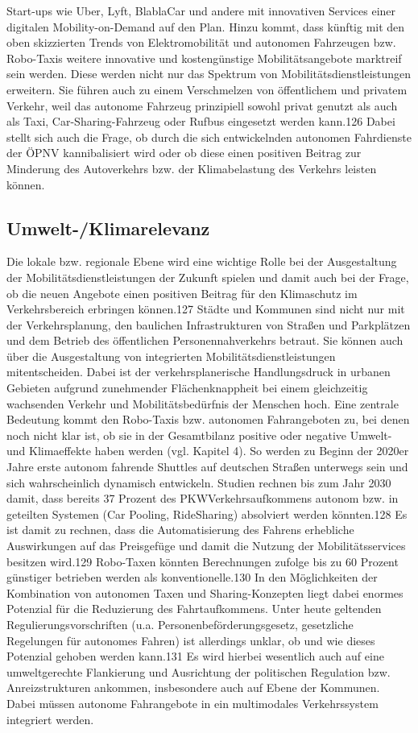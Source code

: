 Start-ups wie Uber, Lyft, BlablaCar und andere mit innovativen Services einer
digitalen Mobility-on-Demand auf den Plan.
Hinzu kommt, dass künftig mit den oben skizzierten Trends von Elektromobilität und autonomen Fahrzeugen bzw. Robo-Taxis weitere innovative und kostengünstige Mobilitätsangebote marktreif sein werden. Diese werden nicht nur
das Spektrum von Mobilitätsdienstleistungen erweitern. Sie führen auch zu einem
Verschmelzen von öffentlichem und privatem Verkehr, weil das autonome Fahrzeug prinzipiell sowohl privat genutzt als auch als Taxi, Car-Sharing-Fahrzeug
oder Rufbus eingesetzt werden kann.126 Dabei stellt sich auch die Frage, ob durch
die sich entwickelnden autonomen Fahrdienste der ÖPNV kannibalisiert wird
oder ob diese einen positiven Beitrag zur Minderung des Autoverkehrs bzw. der
Klimabelastung des Verkehrs leisten können.

\subsection{Umwelt-/Klimarelevanz}
Die lokale bzw. regionale Ebene wird eine wichtige Rolle bei der Ausgestaltung
der Mobilitätsdienstleistungen der Zukunft spielen und damit auch bei der Frage,
ob die neuen Angebote einen positiven Beitrag für den Klimaschutz im Verkehrsbereich erbringen können.127 Städte und Kommunen sind nicht nur mit
der Verkehrsplanung, den baulichen Infrastrukturen von Straßen und Parkplätzen und dem Betrieb des öffentlichen Personennahverkehrs betraut. Sie können
auch über die Ausgestaltung von integrierten Mobilitätsdienstleistungen mitentscheiden. Dabei ist der verkehrsplanerische Handlungsdruck in urbanen Gebieten
aufgrund zunehmender Flächenknappheit bei einem gleichzeitig wachsenden
Verkehr und Mobilitätsbedürfnis der Menschen hoch.
Eine zentrale Bedeutung kommt den Robo-Taxis bzw. autonomen Fahrangeboten zu, bei denen noch nicht klar ist, ob sie in der Gesamtbilanz positive
oder negative Umwelt- und Klimaeffekte haben werden (vgl. Kapitel 4). So werden zu Beginn der 2020er Jahre erste autonom fahrende Shuttles auf deutschen Straßen unterwegs sein und sich wahrscheinlich dynamisch entwickeln.
Studien rechnen bis zum Jahr 2030 damit, dass bereits 37 Prozent des PKWVerkehrsaufkommens autonom bzw. in geteilten Systemen (Car Pooling, RideSharing) absolviert werden könnten.128 Es ist damit zu rechnen, dass die
Automatisierung des Fahrens erhebliche Auswirkungen auf das Preisgefüge und
damit die Nutzung der Mobilitätsservices besitzen wird.129 Robo-Taxen könnten
Berechnungen zufolge bis zu 60 Prozent günstiger betrieben werden als konventionelle.130 In den Möglichkeiten der Kombination von autonomen Taxen und
Sharing-Konzepten liegt dabei enormes Potenzial für die Reduzierung des Fahrtaufkommens. Unter heute geltenden Regulierungsvorschriften (u.a. Personenbeförderungsgesetz, gesetzliche Regelungen für autonomes Fahren) ist allerdings
unklar, ob und wie dieses Potenzial gehoben werden kann.131 Es wird hierbei
wesentlich auch auf eine umweltgerechte Flankierung und Ausrichtung der politischen Regulation bzw. Anreizstrukturen ankommen, insbesondere auch auf
Ebene der Kommunen. Dabei müssen autonome Fahrangebote in ein multimodales Verkehrssystem integriert werden.